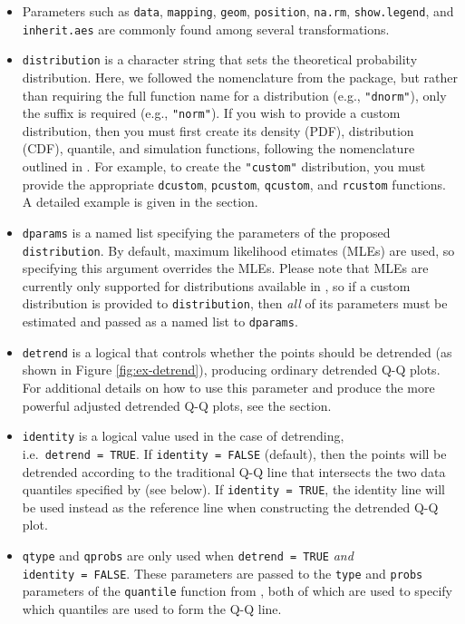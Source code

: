 \begin{itemize}
\item
  Parameters such as \texttt{data}, \texttt{mapping}, \texttt{geom},
  \texttt{position}, \texttt{na.rm}, \texttt{show.legend}, and
  \texttt{inherit.aes} are commonly found among several 
  transformations.
\item
  \texttt{distribution} is a character string that sets the theoretical
  probability distribution. Here, we followed the nomenclature from the
   package, but rather than requiring the full function name
  for a distribution (e.g., \texttt{"dnorm"}), only the suffix is
  required (e.g., \texttt{"norm"}). If you wish to provide a custom
  distribution, then you must first create its density (PDF),
  distribution (CDF), quantile, and simulation functions, following the
  nomenclature outlined in . For example, to create the
  \texttt{"custom"} distribution, you must provide the appropriate
  \texttt{dcustom}, \texttt{pcustom}, \texttt{qcustom}, and
  \texttt{rcustom} functions. A detailed example is given in the
   section.
\item
  \texttt{dparams} is a named list specifying the parameters of the
  proposed \texttt{distribution}. By default, maximum likelihood
  etimates (MLEs) are used, so specifying this argument overrides the
  MLEs. Please note that MLEs are currently only supported for
  distributions available in , so if a custom distribution is
  provided to \texttt{distribution}, then \emph{all} of its parameters
  must be estimated and passed as a named list to \texttt{dparams}.
\item
  \texttt{detrend} is a logical that controls whether the points should
  be detrended (as shown in Figure \ref{fig:ex-detrend}), producing
  ordinary detrended Q-Q plots. For additional details on how to use
  this parameter and produce the more powerful adjusted detrended Q-Q
  plots, see the  section.
\item
  \texttt{identity} is a logical value used in the case of detrending,
  i.e.~\texttt{detrend\ =\ TRUE}. If \texttt{identity\ =\ FALSE}
  (default), then the points will be detrended according to the
  traditional Q-Q line that intersects the two data quantiles specified
  by  (see below). If \texttt{identity\ =\ TRUE}, the
  identity line will be used instead as the reference line when
  constructing the detrended Q-Q plot.
\item
  \texttt{qtype} and \texttt{qprobs} are only used when
  \texttt{detrend\ =\ TRUE} \emph{and} \texttt{identity\ =\ FALSE}.
  These parameters are passed to the \texttt{type} and \texttt{probs}
  parameters of the \texttt{quantile} function from , both of
  which are used to specify which quantiles are used to form the Q-Q
  line.
\end{itemize}

